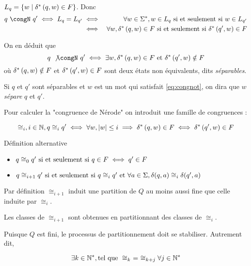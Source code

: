\begin{rappel}
	$L_q = \left\{w \mid \delta^{*} \left(q,w\right) \in F\right\}$.
	Donc
	\begin{eqnarray*}
		q \ \congN \ q' \iff L_q = L_{q'} &\iff& \forall w \in \mots, w \in L_q \mssi w \in L_{q'} \\
		&\iff& \forall w, \deltaS q w \in F \mssi  \deltaS {q'} w \in F
	\end{eqnarray*}

	On en déduit que
	\begin{equation}\label{eq:congnot}
		q \ \not{\congN} \ q' \iff \exists w, \deltaS q w \in F \et \deltaS {q'} w \notin F
	\end{equation}
	où $\delta^{*} \left(q,w\right) \notin F$ et $\delta^{*} \left(q',w\right) \in F$ sont deux états non équivalents, dits \emph{séparables}.
\end{rappel}

Si $q$ et $q'$ sont séparables et $w$ est un mot qui satisfait \ref{eq:congnot}, on dira que $w$ \emph{sépare} $q$ et $q'$.


Pour calculer la "congruence de Nérode" on introduit une famille de congruences :

\begin{equation*}
	\cong_i, i  \in \mathbb{N}, q \cong_i q' \iff \forall w, \left|w\right| \leq i \implies \delta^{*} \left(q,w\right) \in F \iff  \delta^{*} \left(q',w\right) \in F
\end{equation*}


\begin{definition}
	Définition alternative

	\begin{itemize}
		\item $q \cong_0 q' \text{ si et seulement si } q\in F \iff q' \in F$
		\item $q \cong_{i+1} q' \text{ si et seulement si } q \cong_{i} q' \text{ et }  \forall a \in \Sigma, \delta (q,a) \cong_i \delta (q', a)$
	\end{itemize}
\end{definition}

\begin{remarque}
	Par définition $\cong_{i+1}$ induit une partition de $Q$ au moins aussi fine que celle induite par $\cong_i$.

	Les classes de $\cong_{i+1}$ sont obtenues en partitionnant des classes de $\cong_i$.
\end{remarque}

\begin{remarque}
	Puisque $Q$ est fini, le processus de partitionnement doit se stabiliser. Autrement dit,

	$$\exists k \in \mathbb{N}^*, \text{tel que } \cong_{k} \ = \ \cong_{k+j} \forall j \in \mathbb{N}^* $$
\end{remarque}



